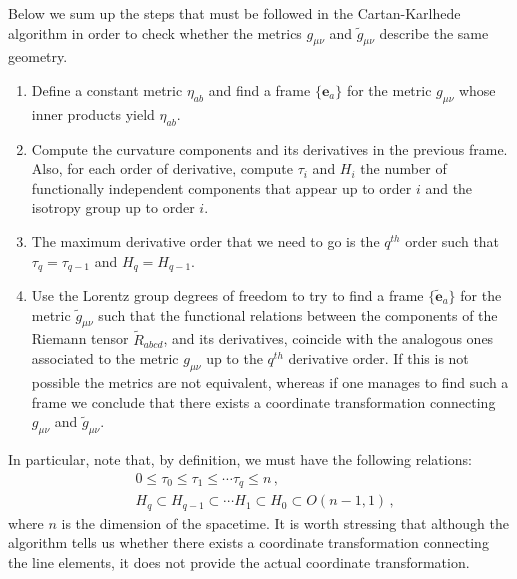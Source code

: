 \documentclass[twocolumn,prd,aps,showpacs,showkeys,amsmath,amssymb]{revtex4-1}
\begin{document}
Below we sum up the steps that must be followed in the Cartan-Karlhede algorithm in order to check whether the metrics $g_{\mu\nu}$ and $\tilde{g}_{\mu\nu}$ describe the same geometry.
\begin{enumerate}
  \item Define a constant metric $\eta_{ab}$ and find a frame $\{\mathbf{e}_a\}$ for the metric $g_{\mu\nu}$ whose inner products yield $\eta_{ab}$.
  \item  Compute the curvature components and its derivatives in the previous frame. Also, for each order of derivative, compute $\tau_i$ and $H_i$ the number of functionally independent components that appear up to order $i$ and the isotropy group up to order $i$.
  \item The maximum derivative order that we need to go is the $q^{th}$ order such that $\tau_q = \tau_{q-1}$ and $H_{q}=H_{q-1}$.
  \item Use the Lorentz group degrees of freedom to try to find a frame $\{\tilde{\mathbf{e}}_a\}$ for the metric $\tilde{g}_{\mu\nu}$ such that the functional relations between the components of the Riemann tensor $\tilde{R}_{abcd}$, and its derivatives, coincide with the analogous ones associated to the metric $g_{\mu\nu}$ up to the $q^{th}$ derivative order. If this is not possible the metrics are not equivalent, whereas if one manages to find such a frame we conclude that  there exists a coordinate transformation connecting $g_{\mu\nu}$ and $\tilde{g}_{\mu\nu}$.
\end{enumerate}
In particular, note that, by definition, we must have the following relations:
\begin{align*}
& 0\leq \tau_0 \leq \tau_1 \leq \cdots  \tau_q \leq n \,, \\
&  H_q \subset H_{q-1} \subset \cdots  H_1 \subset H_0 \subset O(n-1,1)\,,
\end{align*}
where $n$ is the dimension of the spacetime. It is worth stressing that although the algorithm tells us whether there exists a coordinate transformation connecting the line elements, it does not provide the actual coordinate transformation.
\end{document}
